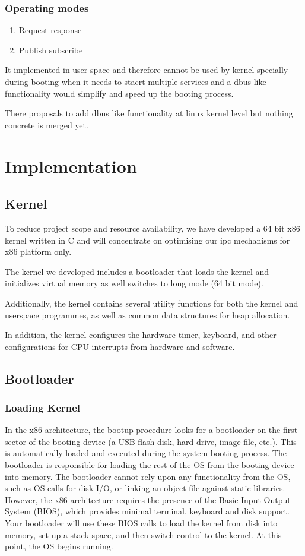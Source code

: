 \documentclass[12pt]{report}
\begin{document}
	\subsection{Operating modes} 
	\begin{enumerate}
		\item Request response
		\item Publish subscribe
	\end{enumerate} 
	
	It implemented in user space and therefore cannot be used by kernel specially during
	booting when it needs to stacrt multiple services and a dbus like functionality would
	simplify and speed up the booting process.
	
	There proposals to add dbus like functionality at linux kernel level but nothing
	concrete is merged yet\cite{citation03}.	
	
    \chapter{Implementation}
		
	\section{Kernel}
	To reduce project scope and resource availability, 
	we have developed a 64 bit x86 kernel written in C and will concentrate 
	on optimising our ipc mechanisms for x86 platform only.
	
	The kernel we developed includes a bootloader that loads the kernel and initializes virtual memory
	as well switches to long mode (64 bit mode).
	
	Additionally, the kernel contains several utility functions for both the kernel and userspace programmes, 
	as well as common data structures for heap allocation. 
	
	In addition, the kernel configures the hardware timer, keyboard, and other configurations for CPU interrupts 
	from hardware and software.

    \section{Bootloader}
    \subsection{Loading Kernel}
    In the x86 architecture, the bootup procedure looks for a bootloader on
    the first sector of the booting device (a USB flash disk, hard drive, image
    file, etc.). This is automatically loaded and executed during the system
    booting process. The bootloader is responsible for loading the rest of the
    OS from the booting device into memory. The bootloader cannot rely upon
    any functionality from the OS, such as OS calls for disk I/O, or linking an
    object file against static libraries. However, the x86 architecture requires the
    presence of the Basic Input Output System (BIOS), which provides minimal
    terminal, keyboard and disk support. Your bootloader will use these BIOS
    calls to load the kernel from disk into memory, set up a stack space, and then
    switch control to the kernel. At this point, the OS begins running.
\end{document}
